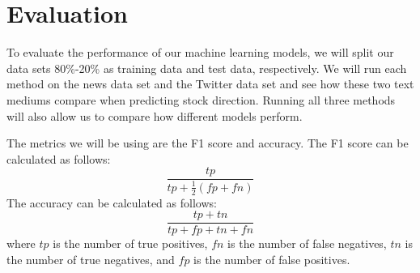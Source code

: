 \documentclass[conference]{IEEEtran}
\begin{document}
\section{Evaluation}
To evaluate the performance of our machine learning models, we will split our data sets 80\%-20\% as training data and test data, respectively. We will run each method on the news data set and the Twitter data set and see how these two text mediums compare when predicting stock direction. Running all three methods will also allow us to compare how different models perform. 

The metrics we will be using are the F1 score and accuracy. The F1 score can be calculated as follows:
\begin{equation*}
 \frac{tp}{tp+\frac{1}{2}(fp+fn)}
\end{equation*}
The accuracy can be calculated as follows:
\begin{equation*}
 \frac{tp + tn}{tp + fp + tn + fn}
\end{equation*}
where $tp$ is the number of true positives, $fn$ is the number of false negatives, $tn$ is the number of true negatives, and $fp$ is the number of false positives. 
\end{document}
